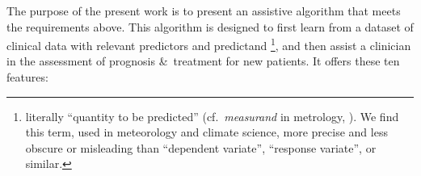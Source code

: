 \documentclass[utf8]{FrontiersinHarvard} %
\newcommand*{\amp}{\&}
\newcommand*{\cf}{{cf.}}
\renewcommand*{\|}[1][]{\nonscript\:#1\vert\nonscript\:\mathopen{}}
\begin{document}
\medskip

The purpose of the present work is to present an assistive algorithm that meets the requirements above. This algorithm is designed to first learn from a dataset of clinical data with relevant predictors and predictand%
%
%
\footnote{literally \enquote{quantity to be predicted} (\cf\ \emph{measurand} in metrology, \citealt[2.3]{jcgm1997_r2012}). We find this term, used in meteorology and climate science, more precise and less obscure or misleading than \enquote{dependent variate}, \enquote{response variate}, or similar.}, and then assist a clinician in the assessment of prognosis \amp\ treatment for new patients. It offers these ten features:
\end{document}
